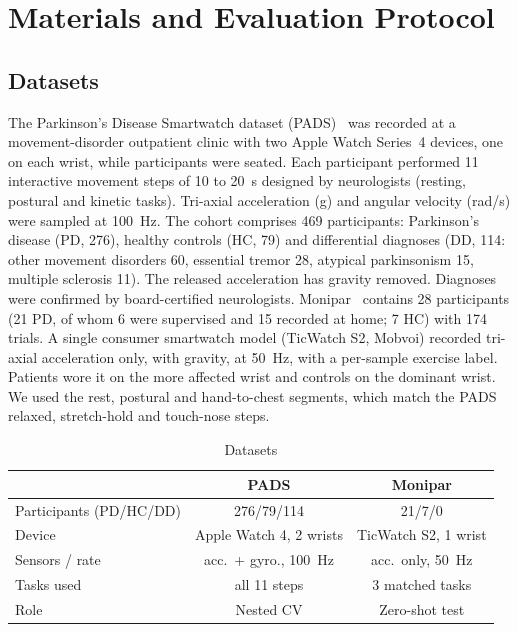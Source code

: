\documentclass[journal,twoside,web]{ieeecolor}
\begin{document}
\section{Materials and Evaluation Protocol}
\subsection{Datasets}
The Parkinson's Disease Smartwatch dataset (PADS)~\cite{Varghese2024,PADSdata} was recorded at a movement-disorder outpatient clinic with two Apple Watch Series~4 devices, one on each wrist, while participants were seated. Each participant performed 11 interactive movement steps of 10 to 20~s designed by neurologists (resting, postural and kinetic tasks). Tri-axial acceleration (g) and angular velocity (rad/s) were sampled at 100~Hz. The cohort comprises 469 participants: Parkinson's disease (PD, 276), healthy controls (HC, 79) and differential diagnoses (DD, 114: other movement disorders 60, essential tremor 28, atypical parkinsonism 15, multiple sclerosis 11). The released acceleration has gravity removed. Diagnoses were confirmed by board-certified neurologists.
Monipar~\cite{Monipar2023,MoniparData} contains 28 participants (21 PD, of whom 6 were supervised and 15 recorded at home; 7 HC) with 174 trials. A single consumer smartwatch model (TicWatch S2, Mobvoi) recorded tri-axial acceleration only, with gravity, at 50~Hz, with a per-sample exercise label. Patients wore it on the more affected wrist and controls on the dominant wrist. We used the rest, postural and hand-to-chest segments, which match the PADS relaxed, stretch-hold and touch-nose steps.

\begin{table}[!t]
\caption{Datasets}
\label{tab:data}
\centering\footnotesize\setlength{\tabcolsep}{3pt}
\begin{tabular}{@{}lcc@{}}
\toprule
 & PADS & Monipar \\
\midrule
Participants (PD/HC/DD) & 276/79/114 & 21/7/0 \\
Device & Apple Watch 4, 2 wrists & TicWatch S2, 1 wrist \\
Sensors / rate & acc.\ + gyro., 100~Hz & acc.\ only, 50~Hz \\
Tasks used & all 11 steps & 3 matched tasks \\
Role & Nested CV & Zero-shot test \\
\bottomrule
\end{tabular}
\end{table}
\end{document}
